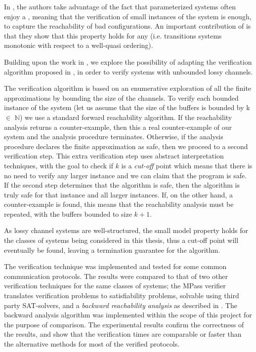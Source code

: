 In \cite{parosh}, the authors take advantage of the fact that parameterized systems often enjoy a , meaning that the verification of small instances of the system is enough, to capture the reachability of bad configurations. An important contribution of \cite{parosh} is that they show that this property holds for any \cite{abdulla2010} (i.e. transitions systems monotonic with respect to a well-quasi ordering).


Building upon the work in \cite{parosh}, we explore the possibility of adapting the verification algorithm proposed in \cite{parosh}, in order to verify systems with unbounded lossy channels.

The verification algorithm is based on an enumerative exploration of all the finite approximations by bounding the size of the channels. To verify each bounded instance of the system (let us assume that the size of the buffers is bounded by k $\in$ $\mathds{N}$) we use a standard forward reachability algorithm. If the reachability analysis returns a counter-example, then this a real counter-example of our system and the analysis procedure terminates. Otherwise, if the analysis procedure declares the finite approximation as safe, then we proceed to a second verification step. This extra verification step uses abstract interpretation techniques\cite{cousot1977}\cite{cousot1979}, with the goal to check if $k$ is a \emph{cut-off} point which means that there is no need to verify any larger instance and we can claim that the program is safe. If the second step determines that the algorithm is safe, then the algorithm is truly safe for that instance and all larger instances. If, on the other hand, a counter-example is found, this means that the reachability analysis must be repeated, with the buffers bounded to size $k+1$.

As lossy channel systems are well-structured, the small model property holds for the classes of systems being considered in this thesis, thus a cut-off point will eventually be found, leaving a termination guarantee for the algorithm.

The verification technique was implemented and tested for some common communication protocols. The results were compared to that of two other verification techniques for the same classes of systems; the MPass\cite{mpass} verifier translates verification problems to satisfiability problems, solvable using third party SAT-solvers, and a \emph{backward reachability analysis} as described in \cite{287591}. The backward analysis algorithm was implemented within the scope of this project for the purpose of comparison. The experimental results confirm the correctness of the results, and show that the verification times are comparable or faster than the alternative methods for most of the verified protocols.

